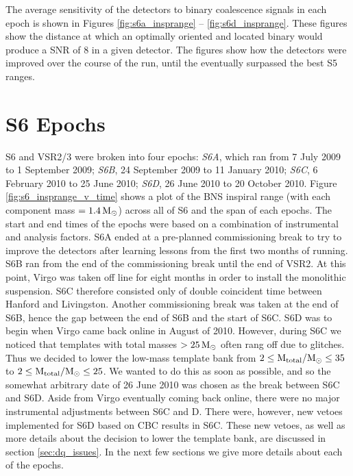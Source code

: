 The average sensitivity of the detectors to binary coalescence signals in each epoch is shown
in Figures \ref{fig:s6a_insprange} -- \ref{fig:s6d_insprange}. These figures show the distance at
which an optimally oriented and located binary would produce a \ac{SNR}
of $8$ in a given detector. The figures show how the detectors were improved over the course of the run, until the eventually surpassed the best \ac{S5} ranges. 

\section{S6 Epochs}

\ac{S6} and VSR2/3 were broken into four epochs: \emph{S6A}, which ran from 7 July 2009 to 1 September 2009; \emph{S6B}, 24 September 2009 to 11 January 2010; \emph{S6C}, 6 February 2010 to 25 June 2010; \emph{S6D}, 26 June 2010 to 20 October 2010. Figure \ref{fig:s6_insprange_v_time} shows a plot of the \ac{BNS} inspiral range (with each component mass $= 1.4\,\mathrm{M_\odot}$) across all of \ac{S6} and the span of each epochs. The start and end times of the epochs were based on a combination of instrumental and analysis factors. S6A ended at a pre-planned commissioning break to try to improve the detectors after learning lessons from the first two months of running. S6B ran from the end of the commissioning break until the end of \ac{VSR2}. At this point, Virgo was taken off line for eight months in order to install the monolithic suspension. S6C therefore consisted only of double coincident time between Hanford and Livingston. Another commissioning break was taken at the end of S6B, hence the gap between the end of S6B and the start of S6C. S6D was to begin when Virgo came back online in August of 2010. However, during S6C we noticed that templates with total masses $> 25\,\mathrm{M_\odot}$ often rang off due to glitches. Thus we decided to lower the low-mass template bank from $2 \leq \mathrm{M_{total}}/\mathrm{M_\odot} \leq 35$ to $2 \leq \mathrm{M_{total}}/\mathrm{M_\odot} \leq 25$. We wanted to do this as soon as possible, and so the somewhat arbitrary date of 26 June 2010 was chosen as the break between S6C and S6D. Aside from Virgo eventually coming back online, there were no major instrumental adjustments between S6C and D. There were, however, new vetoes implemented for S6D based on \ac{CBC} results in S6C. These new vetoes, as well as more details about the decision to lower the template bank, are discussed in section \ref{sec:dq_issues}. In the next few sections we give more details about each of the epochs.

